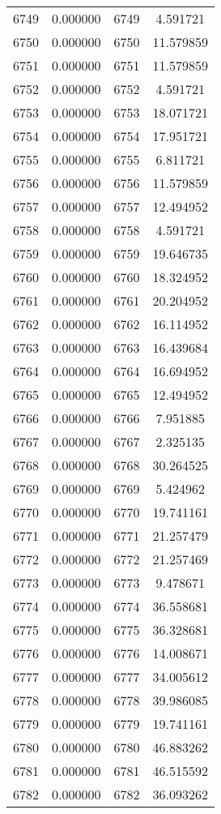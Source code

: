 \documentclass[12pt]{article}
\begin{document}
\begin{longtable}{@{}cccc@{}}
6749 & 0.000000 & 6749 & 4.591721 \\
6750 & 0.000000 & 6750 & 11.579859 \\
6751 & 0.000000 & 6751 & 11.579859 \\
6752 & 0.000000 & 6752 & 4.591721 \\
6753 & 0.000000 & 6753 & 18.071721 \\
6754 & 0.000000 & 6754 & 17.951721 \\
6755 & 0.000000 & 6755 & 6.811721 \\
6756 & 0.000000 & 6756 & 11.579859 \\
6757 & 0.000000 & 6757 & 12.494952 \\
6758 & 0.000000 & 6758 & 4.591721 \\
6759 & 0.000000 & 6759 & 19.646735 \\
6760 & 0.000000 & 6760 & 18.324952 \\
6761 & 0.000000 & 6761 & 20.204952 \\
6762 & 0.000000 & 6762 & 16.114952 \\
6763 & 0.000000 & 6763 & 16.439684 \\
6764 & 0.000000 & 6764 & 16.694952 \\
6765 & 0.000000 & 6765 & 12.494952 \\
6766 & 0.000000 & 6766 & 7.951885 \\
6767 & 0.000000 & 6767 & 2.325135 \\
6768 & 0.000000 & 6768 & 30.264525 \\
6769 & 0.000000 & 6769 & 5.424962 \\
6770 & 0.000000 & 6770 & 19.741161 \\
6771 & 0.000000 & 6771 & 21.257479 \\
6772 & 0.000000 & 6772 & 21.257469 \\
6773 & 0.000000 & 6773 & 9.478671 \\
6774 & 0.000000 & 6774 & 36.558681 \\
6775 & 0.000000 & 6775 & 36.328681 \\
6776 & 0.000000 & 6776 & 14.008671 \\
6777 & 0.000000 & 6777 & 34.005612 \\
6778 & 0.000000 & 6778 & 39.986085 \\
6779 & 0.000000 & 6779 & 19.741161 \\
6780 & 0.000000 & 6780 & 46.883262 \\
6781 & 0.000000 & 6781 & 46.515592 \\
6782 & 0.000000 & 6782 & 36.093262 \\

\end{longtable}
\end{document}
